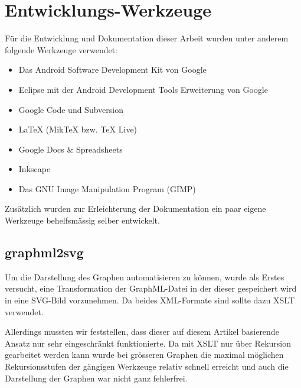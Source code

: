 \chapter{Entwicklungs-Werkzeuge}

Für die Entwicklung und Dokumentation dieser Arbeit wurden unter anderem folgende Werkzeuge verwendet:
\begin{itemize}
	\item Das Android Software Development Kit von Google
	\item Eclipse mit der Android Development Tools Erweiterung von Google
	\item Google Code und Subversion
	\item LaTeX (MikTeX bzw. TeX Live)
	\item Google Docs \& Spreadsheets
	\item Inkscape
	\item Das GNU Image Manipulation Program (GIMP)
\end{itemize}

Zusätzlich wurden zur Erleichterung der Dokumentation ein paar eigene Werkzeuge behelfsmässig selber entwickelt.

\section{graphml2svg}

Um die Darstellung des Graphen automatisieren zu können, wurde als Erstes versucht, eine Transformation der GraphML-Datei in der dieser gespeichert wird in eine SVG-Bild vorzunehmen. Da beides XML-Formate sind sollte dazu XSLT verwendet.

Allerdings mussten wir feststellen, dass dieser auf diesem Artikel\cite{graphml_svg} basierende Ansatz nur sehr eingeschränkt funktionierte. Da mit XSLT nur über Rekursion gearbeitet werden kann wurde bei grösseren Graphen die maximal möglichen Rekursionsstufen der gängigen Werkzeuge relativ schnell erreicht und auch die Darstellung der Graphen war nicht ganz fehlerfrei.

